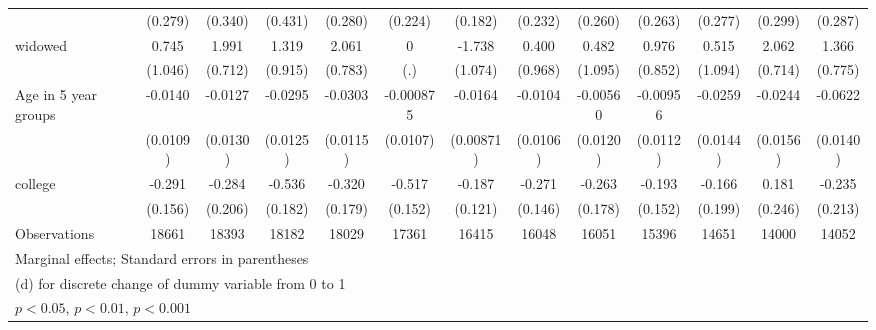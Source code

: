 {\begin{tabular}{l*{12}{c}}
                    &     (0.279)         &     (0.340)         &     (0.431)         &     (0.280)         &     (0.224)         &     (0.182)         &     (0.232)         &     (0.260)         &     (0.263)         &     (0.277)         &     (0.299)         &     (0.287)         \\
[1em]
widowed             &       0.745         &       1.991\sym{**} &       1.319         &       2.061\sym{**} &           0         &      -1.738         &       0.400         &       0.482         &       0.976         &       0.515         &       2.062\sym{**} &       1.366         \\
                    &     (1.046)         &     (0.712)         &     (0.915)         &     (0.783)         &         (.)         &     (1.074)         &     (0.968)         &     (1.095)         &     (0.852)         &     (1.094)         &     (0.714)         &     (0.775)         \\
[1em]
Age in 5 year groups&     -0.0140         &     -0.0127         &     -0.0295\sym{*}  &     -0.0303\sym{**} &   -0.000875         &     -0.0164         &     -0.0104         &    -0.00560         &    -0.00956         &     -0.0259         &     -0.0244         &     -0.0622\sym{***}\\
                    &    (0.0109)         &    (0.0130)         &    (0.0125)         &    (0.0115)         &    (0.0107)         &   (0.00871)         &    (0.0106)         &    (0.0120)         &    (0.0112)         &    (0.0144)         &    (0.0156)         &    (0.0140)         \\
[1em]
college             &      -0.291         &      -0.284         &      -0.536\sym{**} &      -0.320         &      -0.517\sym{***}&      -0.187         &      -0.271         &      -0.263         &      -0.193         &      -0.166         &       0.181         &      -0.235         \\
                    &     (0.156)         &     (0.206)         &     (0.182)         &     (0.179)         &     (0.152)         &     (0.121)         &     (0.146)         &     (0.178)         &     (0.152)         &     (0.199)         &     (0.246)         &     (0.213)         \\
\hline
Observations        &       18661         &       18393         &       18182         &       18029         &       17361         &       16415         &       16048         &       16051         &       15396         &       14651         &       14000         &       14052         \\
\hline\hline
\multicolumn{13}{l}{\footnotesize Marginal effects; Standard errors in parentheses}\\
\multicolumn{13}{l}{\footnotesize  (d) for discrete change of dummy variable from 0 to 1}\\
\multicolumn{13}{l}{\footnotesize \sym{*} \(p<0.05\), \sym{**} \(p<0.01\), \sym{***} \(p<0.001\)}\\
\end{tabular}
}
